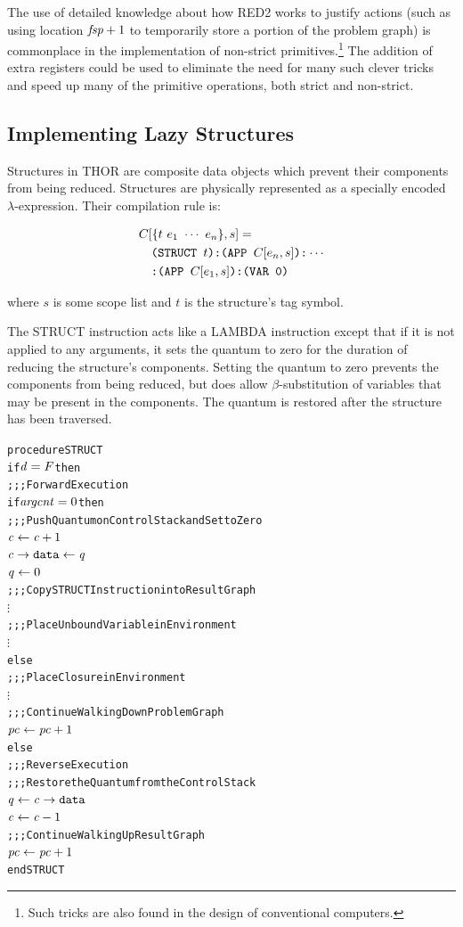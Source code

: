 The use of detailed knowledge about how RED2 works to justify actions (such as using
location \(\mathit{fsp}+1\) to temporarily store a portion of the problem graph) is commonplace in
the implementation of non-strict primitives.\footnote{Such tricks are also found in the
design of conventional computers.} The addition of extra registers could be used to
eliminate the need for many such clever tricks and speed up many of the primitive
operations, both strict and non-strict.


\subsection{Implementing Lazy Structures}

Structures in THOR are composite data objects which prevent their components from being
reduced. Structures are physically represented as a specially encoded \(\lambda\)-expression.
Their compilation rule is:

\[
\begin{aligned}
&C[\{t\ e_1\ \cdots\ e_n\}, s] =\\
&\quad
  \texttt{(STRUCT }t\texttt{):(APP }C[e_n,s]\texttt{):}\cdots\\
&\quad\texttt{:(APP }C[e_1,s]\texttt{):(VAR 0)}
\end{aligned}
\]

where \(s\) is some scope list and \(t\) is the structure's tag symbol.

The STRUCT instruction acts like a LAMBDA instruction except that if it is not applied to
any arguments, it sets the quantum to zero for the duration of reducing the structure's
components. Setting the quantum to zero prevents the components from being reduced, but
does allow \(\beta\)-substitution of variables that may be present in the components. The
quantum is restored after the structure has been traversed.

\par\smallskip\noindent\begin{minipage}{\linewidth}
\begin{alltt}
procedure STRUCT
  if \(\rt{d} = F\) then
    \textrm{;;; Forward Execution}
    if \(\rt{argcnt} = 0\) then
      \textrm{;;; Push Quantum on Control Stack and Set to Zero}
      \(\rt{c} \leftarrow \rt{c}+1\)
      \(\rtfield{c}{data} \leftarrow \rt{q}\)
      \(\rt{q} \leftarrow 0\)
      \textrm{;;; Copy STRUCT Instruction into Result Graph}
      \(\vdots\)
      \textrm{;;; Place Unbound Variable in Environment}
      \(\vdots\)
    else
      \textrm{;;; Place Closure in Environment}
      \(\vdots\)
    \textrm{;;; Continue Walking Down Problem Graph}
    \(\rt{pc} \leftarrow \rt{pc}+1\)
  else
    \textrm{;;; Reverse Execution}
    \textrm{;;; Restore the Quantum from the Control Stack}
    \(\rt{q} \leftarrow \rtfield{c}{data}\)
    \(\rt{c} \leftarrow \rt{c}-1\)
    \textrm{;;; Continue Walking Up Result Graph}
    \(\rt{pc} \leftarrow \rt{pc}+1\)
end STRUCT
\end{alltt}
\end{minipage}\par\smallskip


